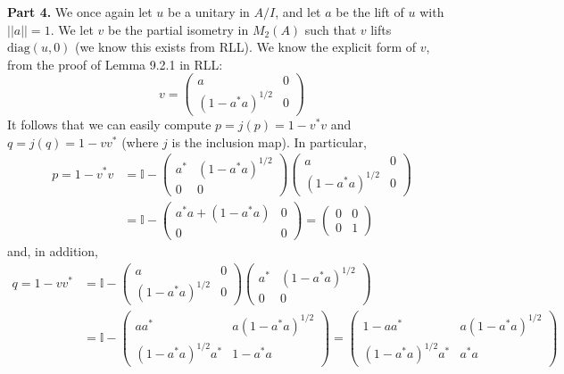 \documentclass[aps,pra,showpacs,notitlepage,onecolumn,superscriptaddress,nofootinbib]{revtex4-1}
\theoremstyle{definition}
\begin{document}
\noindent \textbf{Part 4.} We once again let $u$ be a unitary in $A/I$, and let $a$ be the lift of $u$ with $||a|| = 1$. We let $v$ be the partial isometry in $M_2(A)$
such that $v$ lifts $\text{diag}(u, 0)$ (we know this exists from RLL). We know the explicit form of $v$, from the proof of Lemma 9.2.1 in RLL:
\begin{equation}
  v = \begin{pmatrix} a & 0 \\ (1 - a^{*} a)^{1/2} & 0 \end{pmatrix}
\end{equation}
It follows that we can easily compute $p = j(p) = 1 - v^{*} v$ and $q = j(q) = 1 - v v^{*}$ (where $j$ is the inclusion map). In particular,
\begin{align}
  p = 1 - v^{*} v &= \mathbb{I} - \begin{pmatrix} a^{*} & (1 - a^{*} a)^{1/2} \\ 0 & 0 \end{pmatrix} \begin{pmatrix} a & 0 \\ (1 - a^{*} a)^{1/2} & 0 \end{pmatrix}
  \\ &= \mathbb{I} - \begin{pmatrix} a^{*} a + (1 - a^{*} a) & 0 \\ 0 & 0 \end{pmatrix} = \begin{pmatrix} 0 & 0 \\ 0 & 1 \end{pmatrix}
\end{align}
and, in addition,
\begin{align}
  q = 1 - v v^{*} &= \mathbb{I} - \begin{pmatrix} a & 0 \\ (1 - a^{*} a)^{1/2} & 0 \end{pmatrix} \begin{pmatrix} a^{*} & (1 - a^{*} a)^{1/2} \\ 0 & 0 \end{pmatrix}
  \\ &= \mathbb{I} - \begin{pmatrix} a a^{*} & a (1 - a^{*} a)^{1/2} \\ (1 - a^{*} a)^{1/2} a^{*} & 1 - a^{*} a \end{pmatrix} =  \begin{pmatrix} 1 - a a^{*} & a (1 - a^{*} a)^{1/2} \\ (1 - a^{*} a)^{1/2} a^{*} & a^{*} a \end{pmatrix} 
  \end{align}
\end{document}
